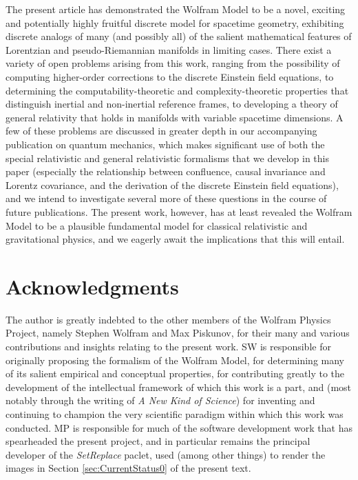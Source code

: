 \documentclass{article}
\begin{document}
The present article has demonstrated the Wolfram Model to be a novel, exciting and potentially highly fruitful discrete model for spacetime geometry, exhibiting discrete analogs of many (and possibly all) of the salient mathematical features of Lorentzian and pseudo-Riemannian manifolds in limiting cases. There exist a variety of open problems arising from this work, ranging from the possibility of computing higher-order corrections to the discrete Einstein field equations, to determining the computability-theoretic and complexity-theoretic properties that distinguish inertial and non-inertial reference frames, to developing a theory of general relativity that holds in manifolds with variable spacetime dimensions. A few of these problems are discussed in greater depth in our accompanying publication on quantum mechanics\cite{gorard_new}, which makes significant use of both the special relativistic and general relativistic formalisms that we develop in this paper (especially the relationship between confluence, causal invariance and Lorentz covariance, and the derivation of the discrete Einstein field equations), and we intend to investigate several more of these questions in the course of future publications. The present work, however, has at least revealed the Wolfram Model to be a plausible fundamental model for classical relativistic and gravitational physics, and we eagerly await the implications that this will entail.

\section*{Acknowledgments}

The author is greatly indebted to the other members of the Wolfram Physics Project, namely Stephen Wolfram and Max Piskunov, for their many and various contributions and insights relating to the present work. SW is responsible for originally proposing the formalism of the Wolfram Model, for determining many of its salient empirical and conceptual properties, for contributing greatly to the development of the intellectual framework of which this work is a part, and (most notably through the writing of \textit{A New Kind of Science}) for inventing and continuing to champion the very scientific paradigm within which this work was conducted. MP is responsible for much of the software development work that has spearheaded the present project, and in particular remains the principal developer of the \textit{SetReplace} paclet\cite{piskunov}, used (among other things) to render the images in Section \ref{sec:CurrentStatus0} of the present text.
\end{document}
